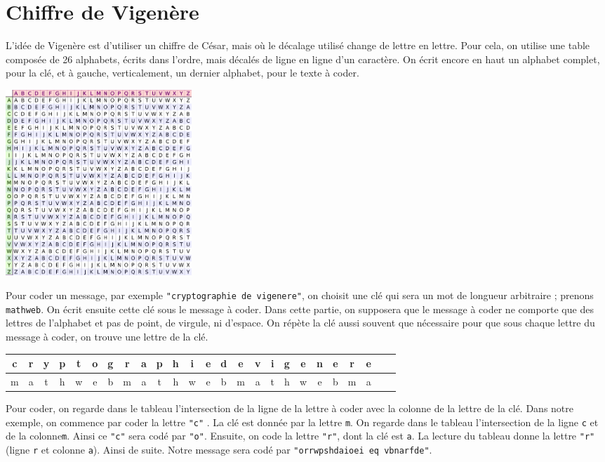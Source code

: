 \documentclass{magnolia}
\begin{document}
\section{Chiffre de Vigenère}

L'idée de Vigenère est d'utiliser un chiffre de César, mais où le
décalage utilisé change de lettre en lettre. Pour cela, on utilise une table composée de
26 alphabets, écrits dans l'ordre, mais décalés de ligne en ligne d'un caractère. On
écrit encore en haut un alphabet complet, pour la clé, et à gauche, verticalement, un
dernier alphabet, pour le texte à coder. 

\begin{center}\includegraphics[width=7cm]{../../Commun/Images/python-tps-vigenere.png}\end{center}

Pour coder un message, par exemple \verb_"cryptographie de vigenere"_, on choisit une clé
qui sera un mot de longueur arbitraire ; prenons \texttt{mathweb}. On écrit ensuite cette
clé sous le message à coder. Dans cette partie, on supposera que le message à coder ne comporte que
des lettres de l'alphabet et pas de point, de virgule, ni d'espace. On répète la clé
aussi souvent que nécessaire pour que sous chaque lettre du message à coder, on trouve
une lettre de la clé.
\begin{center}
\begin{tabular}{|*{25}{c|}}
\hline
c&r&y&p&t&o&g&r&a&p&h&i&e&d&e&v&i&g&e&n&e&r&e\\
\hline
m&a&t&h&w&e&b&m&a&t&h&w&e&b&m&a&t&h&w&e&b&m&a\\
\hline
\end{tabular}
\end{center}

\noindent
Pour coder, on regarde dans le tableau l'intersection de la ligne de la lettre à coder avec
la colonne de la lettre de la clé. Dans notre exemple, on commence par coder la lettre
\verb_"c"_ . La clé est donnée par la lettre  \verb_m_. On regarde dans le tableau 
l'intersection de la \og ligne \fg \verb_c_ et de la \og colonne\fg \verb_m_. Ainsi ce
\verb_"c"_ sera codé par \verb_"o"_. Ensuite, on code la lettre  \verb_"r"_, dont la clé est
\verb_a_. La lecture du tableau donne la lettre  \verb_"r"_ (ligne \verb_r_ et colonne
\verb_a_). Ainsi de suite. Notre message sera codé par \verb_"orrwpshdaioei eq vbnarfde"_. 
\end{document}
